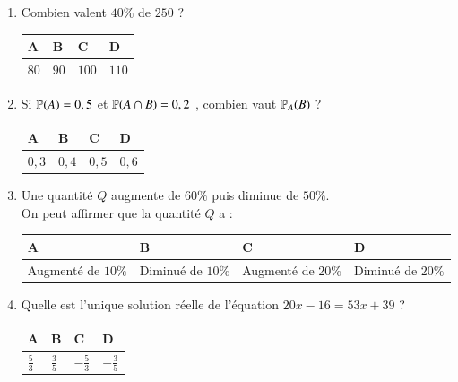 \documentclass[oneside,12pt]{exam}          %
\begin{document}
\begin{enumerate}[label=\underline{Question \no\arabic*} :  , leftmargin=* , itemsep=5mm]
	\item Combien valent $40\%$ de $250$ ? 
	
		\hspace{\linewidth-\textwidth}
		\renewcommand{\arraystretch}{1.5}
		\begin{tabular}{| P{0.22\textwidth} | P{0.22\textwidth} | P{0.22\textwidth} | P{0.22\textwidth} |} \hline
			A & B & C & D \\ \hline
			$80$ & $90$ & $100$ & $110$ \\ \hline
		\end{tabular}



	\item Si ${\mathbb P}(A) = 0,5$ et ${\mathbb P}(A \cap B) = 0,2$ , combien vaut ${\mathbb P}_A(B)$ ?
	
		\hspace{\linewidth-\textwidth}
		\renewcommand{\arraystretch}{1.5}
		\begin{tabular}{| P{0.22\textwidth} | P{0.22\textwidth} | P{0.22\textwidth} | P{0.22\textwidth} |} \hline
			A & B & C & D \\ \hline
			$0,3$ & $0,4$ & $0,5$ & $0,6$ \\\hline
		\end{tabular}
		
		

	\item Une quantité $Q$ augmente de $60\%$ puis diminue de $50\%$.\\
	On peut affirmer que la quantité $Q$ a :
	
		\hspace{\linewidth-\textwidth}
		\renewcommand{\arraystretch}{1.5}
		\begin{tabular}{| P{0.22\textwidth} | P{0.22\textwidth} | P{0.22\textwidth} | P{0.22\textwidth} |} \hline
			A & B & C & D \\ \hline
			Augmenté de $10\%$ & Diminué de $10\%$ & Augmenté de $20\%$ & Diminué de $20\%$ \\\hline
		\end{tabular}
		
		

	\item Quelle est l'unique solution réelle de l'équation $20x - 16 = 53x + 39$ ?
	
		\hspace{\linewidth-\textwidth}
		\renewcommand{\arraystretch}{1.5}
		\begin{tabular}{| P{0.22\textwidth} | P{0.22\textwidth} | P{0.22\textwidth} | P{0.22\textwidth} |} \hline
			A & B & C & D \\ \hline
			$\frac{5}{3}$ & $\frac{3}{5}$	& $-\frac{5}{3}$ & $-\frac{3}{5}$ \\ \hline
		\end{tabular}
		

\end{enumerate}
\end{document}
